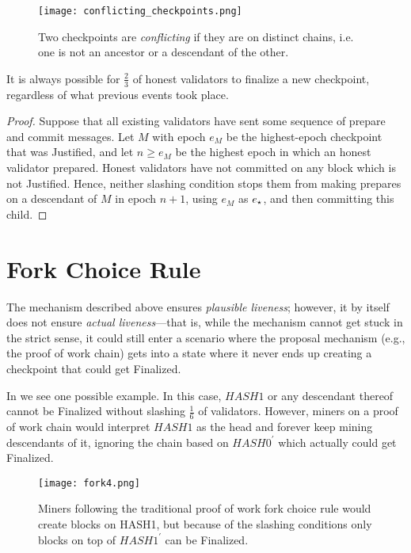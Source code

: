 \documentclass[12pt]{article}
\newcommand{\epoch}{\ensuremath{e}\xspace}
\newcommand{\epochsource}{\ensuremath{\epoch_{\star}}\space}
\begin{document}
\begin{figure}[h!tb]
\centering
    \texttt{[image: conflicting\_checkpoints.png]}
\caption{Two checkpoints are \textit{conflicting} if they are on distinct chains, i.e. one is not an ancestor or a descendant of the other.}
\label{fig:conflicting_checkpoints}
\end{figure}


\begin{theorem}
\label{theorem:liveness}
It is always possible for $\frac{2}{3}$ of honest validators to finalize a new checkpoint, regardless of what previous events took place.

\begin{proof}
Suppose that all existing validators have sent some sequence of prepare and commit messages. Let $M$ with epoch $\epoch_M$ be the highest-epoch checkpoint that was Justified, and let $n \ge \epoch_M$ be the highest epoch in which an honest validator prepared. Honest validators have not committed on any block which is not Justified. Hence, neither slashing condition stops them from making prepares on a descendant of $M$ in epoch $n+1$, using $\epoch_M$ as $\epochsource$, and then committing this child.
\end{proof}

\end{theorem}

\section{Fork Choice Rule}
\label{sect:forkchoice}

The mechanism described above ensures \textit{plausible liveness}; however, it by itself does not ensure \textit{actual liveness}---that is, while the mechanism cannot get stuck in the strict sense, it could still enter a scenario where the proposal mechanism (e.g., the proof of work chain) gets into a state where it never ends up creating a checkpoint that could get Finalized.

In  we see one possible example.  In this case, $HASH1$ or any descendant thereof cannot be Finalized without slashing $\frac{1}{6}$ of validators. However, miners on a proof of work chain would interpret $HASH1$ as the head and forever keep mining descendants of it, ignoring the chain based on $HASH0^\prime$ which actually could get Finalized.

\begin{figure}[h!tb]
\centering
\texttt{[image: fork4.png]}
\caption{Miners following the traditional proof of work fork choice rule would create blocks on HASH1, but because of the slashing conditions only blocks on top of $HASH1^\prime$ can be Finalized.}
\label{fig:forkchoice}
\end{figure}
\end{document}
